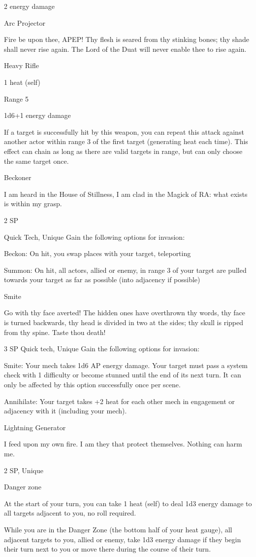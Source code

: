 2 energy damage


Arc Projector

Fire be upon thee, APEP! Thy flesh is seared from thy stinking bones; thy shade shall never rise again. The
Lord of the Duat will never enable thee to rise again.

Heavy Rifle

1 heat (self)

Range 5

1d6+1 energy damage

If a target is successfully hit by this weapon, you can repeat this attack against another actor
within range 3 of the first target (generating heat each time). This effect can chain as long as
there are valid targets in range, but can only choose the same target once.


Beckoner




I am heard in the House of Stillness, I am clad in the Magick of RA: what exists is within my grasp.

2 SP

Quick Tech, Unique
Gain the following options for invasion:

         Beckon: On hit, you swap places with your target, teleporting

         Summon: On hit, all actors, allied or enemy, in range 3 of your target are pulled towards
         your target as far as possible (into adjacency if possible)


Smite

Go with thy face averted! The hidden ones have overthrown thy words, thy face is turned backwards, thy
head is divided in two at the sides; thy skull is ripped from thy spine. Taste thou death!


3 SP
Quick tech, Unique
Gain the following options for invasion:

         	Smite: Your mech takes 1d6 AP energy damage. Your target must pass a system check
         with 1 difficulty or become stunned until the end of its next turn. It can only be affected by
         this option successfully once per scene.

         Annihilate: Your target takes +2 heat for each other mech in engagement or adjacency
         with it (including your mech).

Lightning Generator


I feed upon my own fire. I am they that protect themselves. Nothing can harm me.

2 SP, Unique


Danger zone

At the start of your turn, you can take 1 heat (self) to deal 1d3 energy damage to all targets
adjacent to you, no roll required.


While you are in the Danger Zone (the bottom half of your heat gauge), all adjacent targets to
you, allied or enemy, take 1d3 energy damage if they begin their turn next to you or move there
during the course of their turn.
